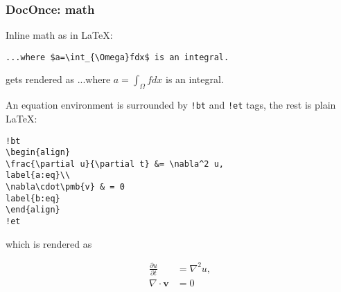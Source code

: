 \documentclass{beamer}
\begin{document}
\begin{frame}
\frametitle{DocOnce: math}

Inline math as in {\LaTeX}:



\begin{verbatim}
...where $a=\int_{\Omega}fdx$ is an integral.

\end{verbatim}

gets rendered as ...where $a=\int_{\Omega}fdx$ is an integral.

An equation environment is surrounded by \Verb?!bt? and \Verb?!et? tags,
the rest is plain {\LaTeX}:










\begin{verbatim}
!bt
\begin{align}
\frac{\partial u}{\partial t} &= \nabla^2 u,
label{a:eq}\\
\nabla\cdot\pmb{v} & = 0
label{b:eq}
\end{align}
!et

\end{verbatim}

which is rendered as

\begin{align}
\frac{\partial u}{\partial t} &= \nabla^2 u,
\label{_a:eq}\\
\nabla\cdot\pmb{v} & = 0
\label{_b:eq}
\end{align}
\end{frame}
\end{document}
